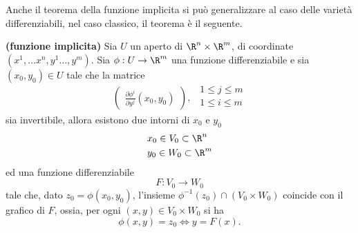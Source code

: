 \documentclass[10pt, letterpaper]{report}
\begin{document}
\noindent Anche il teorema della funzione implicita si può generalizzare al caso delle varietà differenziabili, nel caso classico, il teorema è il seguente.\begin{teorema}\textbf{(funzione implicita)}
    Sia $U$ un aperto di $\R^n\times \R^m$, di coordinate $(x^1,\dots x^n,y^1\dots, y^m)$. Sia $\phi: U\rightarrow \R^m$ una funzione differenziabile e sia $(x_0,y_0)\in U$ tale che la matrice \begin{equation}
        \begin{pmatrix}
            \displaystyle\frac{\partial \phi^i}{\partial y^j}(x_0,y_0)
        \end{pmatrix}, \ \ \begin{matrix}
            1\le j\le m\\ 
            1\le i\le m\\ 
        \end{matrix}
    \end{equation}
    sia invertibile, allora esistono due intorni di $x_0$ e $y_0$\begin{align}
        &x_0\in V_0\subset\R^n\\
        &y_0\in W_0\subset \R^m
    \end{align}
    ed una funzione differenziabile\begin{equation}
        F:V_0\longrightarrow W_0
    \end{equation}
    tale che, dato $z_0=\phi(x_0,y_0)$, l'insieme $\phi^{-1}(z_0)\cap (V_0\times W_0)$
    coincide con il grafico di $F$, ossia, per ogni $(x,y)\in V_0\times W_0$ si ha\begin{equation}
        \phi(x,y)=z_0\iff y=F(x).
    \end{equation}
\end{teorema}
\end{document}
